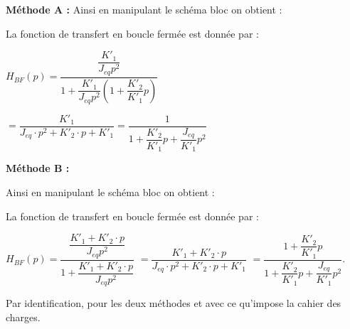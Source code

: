 \documentclass[10pt,fleqn]{article} %
\begin{document}
\begin{multicols}{2}
\textbf{Méthode A :}
Ainsi en manipulant le schéma bloc on obtient : 

\begin{center}
\end{center}

La fonction de transfert en boucle fermée est donnée par : 

$
H_{BF}(p)=\dfrac{\dfrac{K'_1}{J_{eq}p^2}}{1+\dfrac{K'_1}{J_{eq}p^2}\left(1+\dfrac{K'_2}{K'_1}p\right)}$

$=
\dfrac{K'_1}{J_{eq}\cdot p^2+K'_2\cdot p+K'_1}=\dfrac{1}{1+\dfrac{K'_2}{K'_1}p+\dfrac{J_{eq}}{K'_1}p^2}
$


\textbf{Méthode B :}

Ainsi en manipulant le schéma bloc on obtient : 

\begin{center}
\end{center}

La fonction de transfert en boucle fermée est donnée par : 

$
H_{BF}(p)=\dfrac{\dfrac{K'_1+K'_2\cdot p}{J_{eq}p^2}}{1+\dfrac{K'_1+K'_2\cdot p}{J_{eq}p^2}}$
$ =\dfrac{K'_1+K'_2\cdot p}{J_{eq}\cdot p^2+K'_2\cdot p+K'_1}$
$=\dfrac{1+\dfrac{K'_2}{K'_1}p}{1+\dfrac{K'_2}{K'_1}p+\dfrac{J_{eq}}{K'_1}p^2}$.

\end{multicols}
Par identification, pour les deux méthodes et avec ce qu'impose la cahier des charges.
\end{document}
